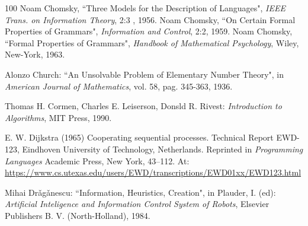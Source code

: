 \begin{thebibliography}{100}
 Noam Chomsky, ``Three Models for the Description of Languages", {\em IEEE
Trans. on Information Theory}, 2:3 , 1956.
 Noam Chomsky, ``On Certain Formal Properties of Grammars", {\em
Information and Control}, 2:2, 1959.
 Noam Chomsky, ``Formal Properties of Grammars", {\em Handbook of
Mathematical Psychology}, Wiley, New-York, 1963.

 Alonzo Church: ``An Unsolvable Problem of Elementary
Number Theory", in {\em American Journal of Mathematics}, vol. 58,
pag. 345-363,
 1936.


 Thomas H. Cormen, Charles E. Leiserson, Donsld R. Rivest: {\em Introduction to Algorithms}, MIT Press, 1990.



 E. W. Dijkstra (1965) Cooperating sequential processes. Technical Report EWD-123, Eindhoven University of Technology, Netherlands. Reprinted in {\em  Programming Languages} Academic Press, New York, 43--112. At: \url{https://www.cs.utexas.edu/users/EWD/transcriptions/EWD01xx/EWD123.html}


 Mihai Dr\v ag\v anescu: ``Information,
Heuristics, Creation", in Plauder, I. (ed): {\em Artificial Inteligence and Information Control System of Robots}, Elsevier Publishers B. V. (North-Holland), 1984.



\end{thebibliography}

